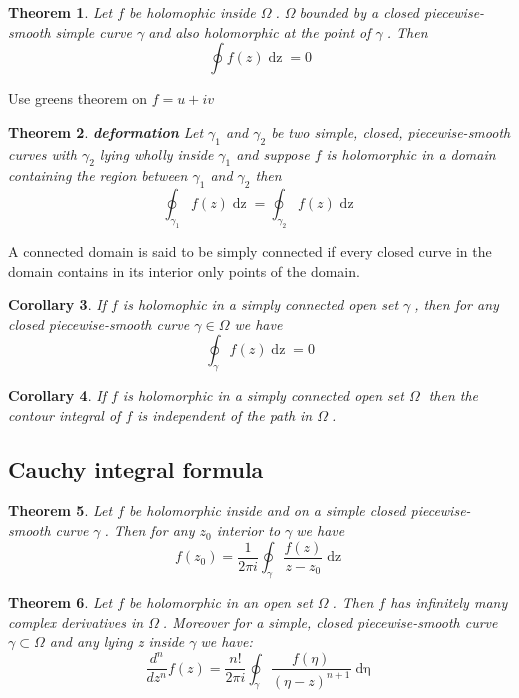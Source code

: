 \documentclass{article}
\newtheorem{theorem}{Theorem}[section]
\newtheorem{corollary}[theorem]{Corollary}
\newenvironment{proof}[1][Proof]{\begin{trivlist}
\item[\hskip \labelsep {\bfseries #1}]}{\end{trivlist}}
\newenvironment{definition}[1][Definition]{\begin{trivlist}
\item[\hskip \labelsep {\bfseries #1}]}{\end{trivlist}}
\newcommand{\OO}{$ \Omega \;$}
\newcommand{\GG}{$ \gamma \;$}
\begin{document}
\begin{theorem} \label{Cauchy-Goursat}
    Let $f$ be holomophic inside \OO. \OO bounded by a closed piecewise-smooth simple
    curve \GG and also holomorphic at the point of \GG. Then
    \[\oint f(z) \mathop{dz} = 0 \]
\end{theorem}
\begin{proof}
    Use greens theorem on $f = u + iv$
\end{proof}

\begin{theorem} \label{deformation} \textbf{deformation}
    Let $\gamma_1$ and $\gamma_2$ be two simple, closed, piecewise-smooth curves with $\gamma_2$ lying wholly inside $\gamma_1$ and suppose $f$
    is holomorphic in a domain containing the region between $\gamma_1$ and $\gamma_2$ then
    \[\oint_{\gamma_1} f(z) \mathop{dz} = \oint_{\gamma_2} f(z) \mathop{dz}\]
\end{theorem}

\begin{definition}
    A connected domain is said to be simply connected if every closed curve in the domain contains in its interior only points of the domain.
\end{definition}

\begin{corollary}
    If $f$ is holomophic in a simply connected open set \GG, then for any closed piecewise-smooth curve $\gamma \in \Omega$ we have
    \[\oint_\gamma f(z) \mathop{dz} = 0\]
\end{corollary}
\begin{corollary}
    If $f$ is holomorphic in a simply connected open set \OO
    then the contour integral of $f$ is independent of the path in \OO.
\end{corollary}

\subsection*{Cauchy integral formula}

\begin{theorem}
    Let $f$ be holomorphic inside and on a simple closed piecewise-smooth curve \GG.
    Then for any $z_0$ interior to \GG we have
    \[f(z_0) = \frac{1}{2\pi i}\oint_\gamma \frac{f(z)}{z - z_0} \mathop{dz}\]
\end{theorem}

\begin{theorem}
    Let $f$ be holomorphic in an open set \OO. Then $f$ has infinitely many complex
    derivatives in \OO. Moreover for a simple, closed piecewise-smooth curve $\gamma \subset \Omega$
    and any lying z inside \GG we have:
    \[\frac{d^n}{dz^n} f(z) = \frac{n!}{2 \pi i} \oint_\gamma \frac{f(\eta)}{\left(\eta - z\right)^{n+1}} \mathop{d\eta}\]
\end{theorem}
\end{document}
